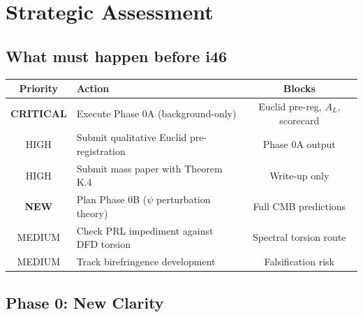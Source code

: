 \documentclass[11pt,a4paper]{article}
\begin{document}
\section{Strategic Assessment}

\subsection{What must happen before i46}

\begin{center}
\begin{tabular}{clc}
\toprule
\textbf{Priority} & \textbf{Action} & \textbf{Blocks} \\
\midrule
\textbf{CRITICAL} & Execute Phase 0A (background-only) & Euclid pre-reg, $A_L$, scorecard \\
HIGH & Submit qualitative Euclid pre-registration & Phase 0A output \\
HIGH & Submit mass paper with Theorem K.4 & Write-up only \\
\textbf{NEW} & Plan Phase 0B ($\psi$ perturbation theory) & Full CMB predictions \\
MEDIUM & Check PRL impediment against DFD torsion & Spectral torsion route \\
MEDIUM & Track birefringence development & Falsification risk \\
\bottomrule
\end{tabular}
\end{center}

\subsection{Phase 0: New Clarity}
\end{document}
